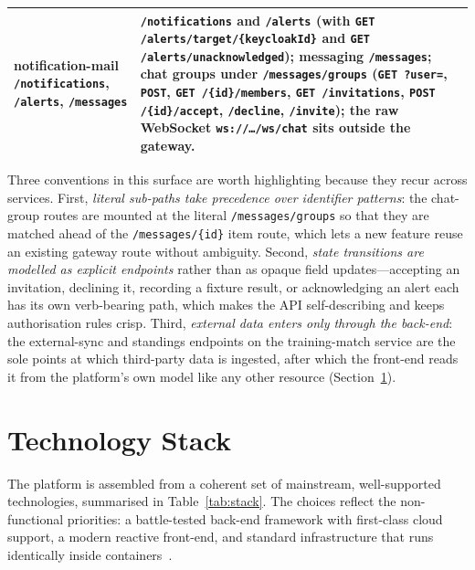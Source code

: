 \begin{table}[htbp]
\begin{tabular}{|p{}|p{}|}
\hline
notification-mail \newline \texttt{/notifications}, \texttt{/alerts}, \texttt{/messages} &
\texttt{/notifications} and \texttt{/alerts} (with \texttt{GET /alerts/target/\{keycloakId\}} and \texttt{GET /alerts/unacknowledged}); messaging \texttt{/messages}; chat groups under \texttt{/messages/groups} (\texttt{GET ?user=}, \texttt{POST}, \texttt{GET /\{id\}/members}, \texttt{GET /invitations}, \texttt{POST /\{id\}/accept}, \texttt{/decline}, \texttt{/invite}); the raw WebSocket \texttt{ws://\dots/ws/chat} sits outside the gateway. \\
\hline
\end{tabular}
\end{table}

Three conventions in this surface are worth highlighting because they recur across
services. First, \emph{literal sub-paths take precedence over identifier patterns}: the
chat-group routes are mounted at the literal \texttt{/messages/groups} so that they are
matched ahead of the \texttt{/messages/\{id\}} item route, which lets a new feature reuse
an existing gateway route without ambiguity. Second, \emph{state transitions are modelled
as explicit endpoints} rather than as opaque field updates---accepting an invitation,
declining it, recording a fixture result, or acknowledging an alert each has its own
verb-bearing path, which makes the API self-describing and keeps authorisation rules
crisp. Third, \emph{external data enters only through the back-end}: the external-sync and
standings endpoints on the training-match service are the sole points at which
third-party data is ingested, after which the front-end reads it from the platform's own
model like any other resource (Section~\ref{sec:tech-stack}).

\section{Technology Stack}
\label{sec:tech-stack}

The platform is assembled from a coherent set of mainstream, well-supported
technologies, summarised in Table~\ref{tab:stack}. The choices reflect the
non-functional priorities: a battle-tested back-end framework with first-class cloud
support, a modern reactive front-end, and standard infrastructure that runs identically
inside containers~\cite{docker}.

